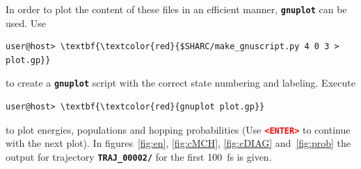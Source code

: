 \documentclass[a4paper,11pt,DIV=15,openany]{scrbook}
\newcommand{\ttt}[1]{\textbf{\texttt{#1}}}
\begin{document}
In order to plot the content of these files in an efficient manner, \ttt{gnuplot} can be used. Use
\begin{Verbatim}[commandchars=\\\{\}]
user@host> \textbf{\textcolor{red}{$SHARC/make_gnuscript.py 4 0 3 > plot.gp}}
\end{Verbatim}
to create a \ttt{gnuplot} script with the correct state numbering and labeling. Execute
\begin{Verbatim}[commandchars=\\\{\}]
user@host> \textbf{\textcolor{red}{gnuplot plot.gp}}
\end{Verbatim}
to plot energies, populations and hopping probabilities (Use \textcolor{red}{\ttt{<ENTER>}} to continue with the next plot). In figures~\ref{fig:en}, \ref{fig:cMCH}, \ref{fig:cDIAG} and~\ref{fig:prob} the output for trajectory \ttt{TRAJ\_00002/} for the first 100~fs is given.
\end{document}
